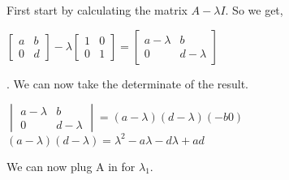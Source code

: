 \newline
		First start by calculating the matrix $A-\lambda I$.  So we get,
		\begin{center}
		    $
		    \begin{bmatrix}
		    a & b \\ 0 & d
		    \end{bmatrix}-
		    \lambda
		    \begin{bmatrix}
		    1 & 0 \\ 0 & 1
		    \end{bmatrix}=
		    \begin{bmatrix}
		    a-\lambda & b \\ 0 & d-\lambda
		    \end{bmatrix}
		   $
		\end{center}.
	    We can now take the determinate of the result.
	    \newline
	    \begin{center}
	        $\begin{vmatrix}
	        a-\lambda & b \\ 0 & d-\lambda
	        \end{vmatrix}=
	        (a-\lambda)(d-\lambda)(-b0)$
	        \newline
	        $(a-\lambda)(d-\lambda)=\lambda^2-a\lambda-d\lambda+ad$
	        \newline
	    \end{center}
	    We can now plug A in for $\lambda_1$.
